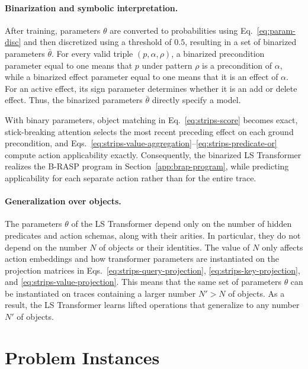 \paragraph{Binarization and symbolic interpretation.}
After training, parameters $\theta$ are converted to probabilities using Eq.~\ref{eq:param-disc} and then discretized using a threshold of $0.5$,
resulting in a set of binarized parameters $\bar{\theta}$.
For every valid triple $(p,\alpha,\rho)$, a binarized precondition parameter equal to one means that $p$ under pattern $\rho$ is a precondition of $\alpha$, while a binarized effect parameter equal to one means that it is an effect of $\alpha$.
For an active effect, its sign parameter determines whether it is an add or delete effect.
Thus, the binarized parameters $\bar{\theta}$ directly specify a \strips model.

With binary parameters, object matching in Eq.~\ref{eq:strips-score} becomes exact, stick-breaking attention selects the most recent preceding effect on each ground precondition, and Eqs.~\ref{eq:strips-value-aggregation}--\ref{eq:strips-predicate-or} compute action applicability exactly.
Consequently, the binarized LS Transformer realizes the B-RASP program in Section~\ref{app:brap-program}, while predicting applicability for each separate action rather than for the entire trace.

\paragraph{Generalization over objects.}
The parameters $\theta$ of the LS Transformer depend only on the number of hidden predicates and action schemas, along with their arities. In particular, they do not depend on the number $N$ of objects or their identities.
The value of $N$ only affects action embeddings and how transformer parameters are instantiated on the projection matrices in Eqs.~\ref{eq:strips-query-projection}, \ref{eq:strips-key-projection}, and \ref{eq:strips-value-projection}.
This means that the same set of parameters $\theta$ can be instantiated on traces containing a larger number $N'>N$ of objects.
As a result, the LS Transformer learns lifted operations that generalize to any number $N'$ of objects.



\section{Problem Instances}
\label{app:problems}


